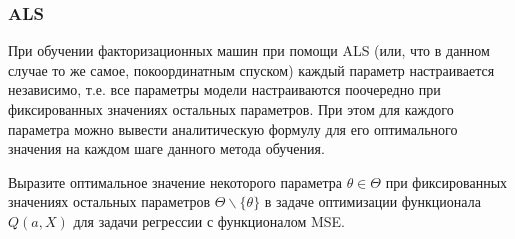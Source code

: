 \documentclass[12pt,a4paper]{article}
\begin{document}
\begin{algorithmic}
	\vspace{0.5cm}
	\REPEAT
			\ENDFOR
		\ENDFOR
	\ENDFOR
\end{algorithmic}

\subsubsection{ALS}
	При обучении факторизационных машин при помощи ALS (или, что в данном случае то же самое, покоординатным спуском) каждый параметр настраивается независимо, т.е. все параметры модели настраиваются поочередно при фиксированных значениях остальных параметров. При этом для каждого параметра можно вывести аналитическую формулу для его оптимального значения на каждом шаге данного метода обучения.

\begin{vkProblem}
	Выразите оптимальное значение некоторого параметра $\theta \in \Theta$ при фиксированных значениях остальных параметров $\Theta \backslash \{\theta \}$ в задаче оптимизации функционала $Q(a, X)$ для задачи регрессии с функционалом MSE.
\end{vkProblem}
\end{document}
